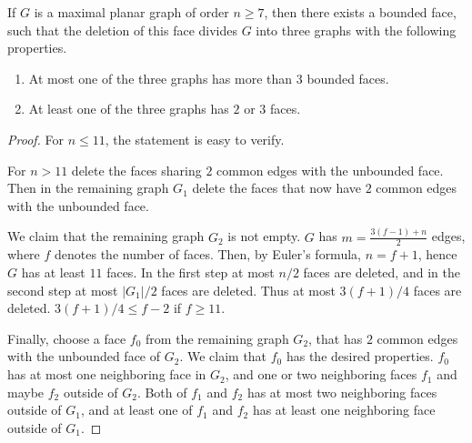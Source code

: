 \begin{lemma} \label{lem:del_face}
  If $G$ is a maximal planar graph of order $n \ge 7$, then there exists a bounded
  face, such that the deletion of this face divides $G$ into three graphs with the
  following properties.
  \begin{enumerate}
    \item At most one of the three graphs has more than $3$ bounded faces.
    \item At least one of the three graphs has $2$ or $3$ faces.
  \end{enumerate}
\end{lemma}
\begin{proof}
  For $n \le 11$, the statement is easy to verify.

  For $n > 11$ delete the faces sharing $2$ common edges with the unbounded face. Then in the remaining
  graph $G_1$ delete the faces that now have $2$ common edges with the unbounded face.

  We claim that the remaining graph $G_2$ is not empty. $G$
  has $m = \frac{3(f - 1) + n}{2}$ edges, where $f$ denotes the number of faces.
  Then, by Euler's formula, $n = f + 1$, hence $G$ has at least $11$ faces. In the
  first step at most $n/2$ faces are deleted, and in the second step at most
  $|G_1|/2$ faces are deleted. Thus at most $3(f + 1) / 4$ faces are deleted.
  $3(f + 1) / 4 \le f - 2$ if $f \ge 11$.

  Finally, choose a face $f_0$ from the remaining graph $G_2$, that has $2$ common edges with
  the unbounded face of $G_2$. We claim that $f_0$ has the desired properties. $f_0$ has at most
  one neighboring face in $G_2$, and one or two neighboring faces $f_1$ and maybe $f_2$ outside of $G_2$.
  Both of $f_1$ and $f_2$ has at most two neighboring faces outside of $G_1$, and
  at least one of $f_1$ and $f_2$ has at least one neighboring face outside of $G_1$.
\end{proof}

